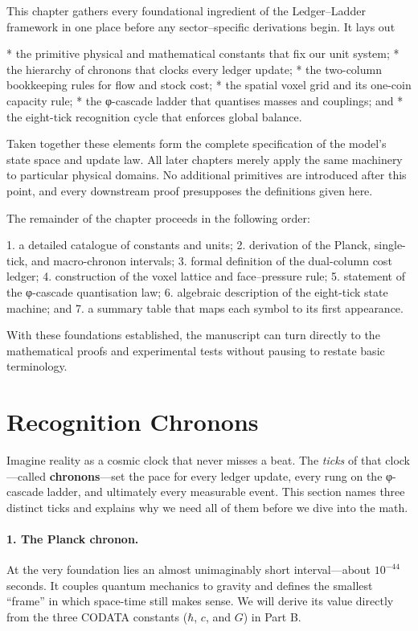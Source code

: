 \documentclass[11pt,oneside]{book}
\begin{document}
This chapter gathers every foundational ingredient of the Ledger–Ladder
framework in one place before any sector–specific derivations begin.  It lays
out

* the primitive physical and mathematical constants that fix our unit system;
* the hierarchy of chronons that clocks every ledger update;
* the two-column bookkeeping rules for flow and stock cost;
* the spatial voxel grid and its one-coin capacity rule;
* the φ-cascade ladder that quantises masses and couplings; and
* the eight-tick recognition cycle that enforces global balance.

Taken together these elements form the complete specification of the model’s
state space and update law.  All later chapters merely apply the same machinery
to particular physical domains.  No additional primitives are introduced after
this point, and every downstream proof presupposes the definitions given here.

The remainder of the chapter proceeds in the following order:

1. a detailed catalogue of constants and units;
2. derivation of the Planck, single-tick, and macro-chronon intervals;
3. formal definition of the dual-column cost ledger;
4. construction of the voxel lattice and face–pressure rule;
5. statement of the φ-cascade quantisation law;
6. algebraic description of the eight-tick state machine; and
7. a summary table that maps each symbol to its first appearance.

With these foundations established, the manuscript can turn directly to the
mathematical proofs and experimental tests without pausing to restate basic
terminology.



\section{Recognition Chronons}
\label{sec:recognition-chronons}


Imagine reality as a cosmic clock that never misses a beat.  
The \emph{ticks} of that clock—called \textbf{chronons}—set the pace for every
ledger update, every rung on the φ-cascade ladder, and ultimately every
measurable event.  This section names three distinct ticks and explains why we
need all of them before we dive into the math.

\paragraph{1.  The Planck chronon.}
At the very foundation lies an almost unimaginably short interval—about
$10^{-44}$ seconds.  It couples quantum mechanics to gravity and defines the
smallest “frame” in which space-time still makes sense.  We will derive its
value directly from the three CODATA constants ($\hbar$, $c$, and $G$) in Part B.
\end{document}
